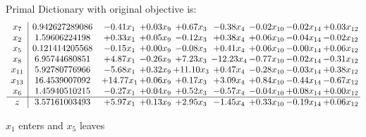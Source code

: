 \documentclass[8pt]{article}
\begin{document}
Primal Dictionary with original objective is:
\[\begin{array}{c| c c@{\hskip 2pt} c@{\hskip 2pt} c@{\hskip 2pt} c@{\hskip 2pt} c@{\hskip 2pt} c@{\hskip 2pt} c@{\hskip 2pt} }
 x_{7}   &  0.942627289086 & -0.41 x_{1} & +  0.03 x_{9} & +  0.67 x_{3} & -0.38 x_{4} & -0.02 x_{10} & -0.02 x_{14} & +  0.03 x_{12}\\
 x_{2}   &  1.59606224198 & +  0.33 x_{1} & +  0.05 x_{9} & -0.12 x_{3} & +  0.38 x_{4} & +  0.06 x_{10} & -0.04 x_{14} & -0.02 x_{12}\\
 x_{5}   &  0.121414205568 & -0.15 x_{1} & +  0.00 x_{9} & -0.08 x_{3} & +  0.41 x_{4} & +  0.06 x_{10} & -0.00 x_{14} & +  0.06 x_{12}\\
 x_{8}   &  6.95744680851 & +  4.87 x_{1} & -0.26 x_{9} & +  7.23 x_{3} & -12.23 x_{4} & -0.77 x_{10} & -0.02 x_{14} & -0.31 x_{12}\\
 x_{11}   &  5.92780776966 & -5.68 x_{1} & +  0.32 x_{9} & + 11.10 x_{3} & +  0.47 x_{4} & -0.28 x_{10} & -0.03 x_{14} & +  0.38 x_{12}\\
 x_{13}   &  16.4539007092 & + 14.77 x_{1} & +  0.06 x_{9} & +  0.17 x_{3} & +  3.09 x_{4} & +  0.84 x_{10} & -0.44 x_{14} & -0.67 x_{12}\\
 x_{6}   &  1.45940510215 & -0.27 x_{1} & +  0.04 x_{9} & +  0.52 x_{3} & -0.57 x_{4} & -0.04 x_{10} & +  0.08 x_{14} & +  0.00 x_{12}\\
\hline
z    &  3.57161003493 & +  5.97 x_{1} & +  0.13 x_{9} & +  2.95 x_{3} & -1.45 x_{4} & +  0.33 x_{10} & -0.19 x_{14} & +  0.06 x_{12}\\
\end{array}\]


 $ x_{1} $ enters and $ x_{5} $ leaves 
\end{document}
